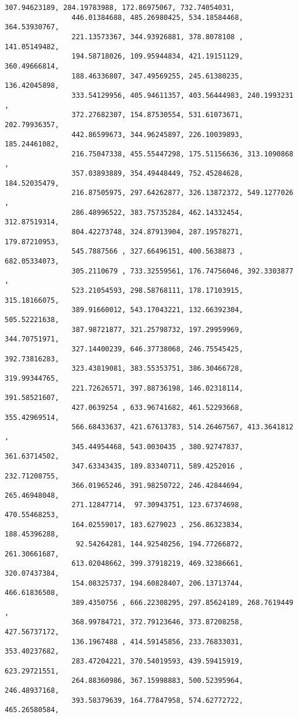 \documentclass[11pt]{article}
\begin{document}
\begin{Verbatim}[commandchars=\\\{\}]
                307.94623189, 284.19783988, 172.86975067, 732.74054031,
                446.01384688, 485.26980425, 534.18584468, 364.53930767,
                221.13573367, 344.93926881, 378.8078108 , 141.05149482,
                194.58718026, 109.95944834, 421.19151129, 360.49666814,
                188.46336807, 347.49569255, 245.61380235, 136.42045898,
                333.54129956, 405.94611357, 403.56444983, 240.1993231 ,
                372.27682307, 154.87530554, 531.61073671, 202.79936357,
                442.86599673, 344.96245897, 226.10039893, 185.24461082,
                216.75047338, 455.55447298, 175.51156636, 313.1090868 ,
                357.03893889, 354.49448449, 752.45284628, 184.52035479,
                216.87505975, 297.64262877, 326.13872372, 549.1277026 ,
                286.48996522, 383.75735284, 462.14332454, 312.87519314,
                804.42273748, 324.87913904, 287.19578271, 179.87210953,
                545.7887566 , 327.66496151, 400.5638873 , 682.05334073,
                305.2110679 , 733.32559561, 176.74756046, 392.3303877 ,
                523.21054593, 298.58768111, 178.17103915, 315.18166075,
                389.91660012, 543.17043221, 132.66392304, 505.52221638,
                387.98721877, 321.25798732, 197.29959969, 344.70751971,
                327.14400239, 646.37738068, 246.75545425, 392.73816283,
                323.43819081, 383.55353751, 386.30466728, 319.99344765,
                221.72626571, 397.88736198, 146.02318114, 391.58521607,
                427.0639254 , 633.96741682, 461.52293668, 355.42969514,
                566.68433637, 421.67613783, 514.26467567, 413.3641812 ,
                345.44954468, 543.0030435 , 380.92747837, 361.63714502,
                347.63343435, 189.83340711, 589.4252016 , 232.71208755,
                366.01965246, 391.98250722, 246.42844694, 265.46948048,
                271.12847714,  97.30943751, 123.67374698, 470.55468253,
                164.02559017, 183.6279023 , 256.86323834, 188.45396288,
                 92.54264281, 144.92540256, 194.77266872, 261.30661687,
                613.02048662, 399.37918219, 469.32386661, 320.07437384,
                154.08325737, 194.60828407, 206.13713744, 466.61836508,
                389.4350756 , 666.22308295, 297.85624189, 268.7619449 ,
                368.99784721, 372.79123646, 373.87208258, 427.56737172,
                136.1967488 , 414.59145856, 233.76833031, 353.40237682,
                283.47204221, 370.54019593, 439.59415919, 623.29721551,
                264.88360986, 367.15998883, 500.52395964, 246.48937168,
                393.58379639, 164.77847958, 574.62772722, 465.26580584,

\end{Verbatim}
\end{document}
